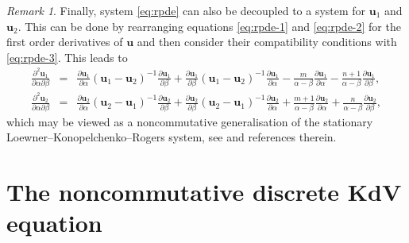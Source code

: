 \documentclass[dvips,10pt]{article}
\newcommand{\bs}{\boldsymbol}
\newcommand{\bsu}{ {\bs{u}}}
\theoremstyle{remark} %
\newtheorem{remark}{Remark}
\begin{document}
\begin{remark}
		Finally, system \eqref{eq:rpde} can also be decoupled to a system for $\bsu_1$ and $\bsu_2$. This can be done by rearranging equations \eqref{eq:rpde-1} and \eqref{eq:rpde-2} for the first order derivatives of $\bsu$ and then consider their compatibility conditions with \eqref{eq:rpde-3}. This leads to 
		\begin{eqnarray*}
			\frac{\partial^2 {\bs{u}}_1}{\partial \alpha \partial \beta} &=& \frac{\partial {\bs{u}}_1}{\partial \alpha}\left({\bs{u}}_{1} -{\bs{u}}_{2}\right) ^{-1}   \frac{\partial {\bs{u}}_1}{\partial \beta} +  \frac{\partial {\bs{u}}_1}{\partial \beta}\left({\bs{u}}_{1} -{\bs{u}}_{2}\right) ^{-1}   \frac{\partial {\bs{u}}_1}{\partial \alpha} - \frac{m}{\alpha-\beta}  \frac{\partial {\bs{u}}_1}{\partial \alpha} - \frac{n+1}{\alpha-\beta}   \frac{\partial {\bs{u}}_1}{\partial \beta}, \\
			\frac{\partial^2 {\bs{u}}_2}{\partial \alpha \partial \beta} &=& \frac{\partial {\bs{u}}_2}{\partial \alpha}\left({\bs{u}}_{2} -{\bs{u}}_{1}\right) ^{-1}   \frac{\partial {\bs{u}}_2}{\partial \beta}  + \frac{\partial {\bs{u}}_2}{\partial \beta}\left({\bs{u}}_{2} -{\bs{u}}_{1}\right) ^{-1}   \frac{\partial {\bs{u}}_2}{\partial \alpha} + \frac{m+1}{\alpha-\beta}  \frac{\partial {\bs{u}}_2}{\partial \alpha} + \frac{n}{\alpha-\beta}   \frac{\partial {\bs{u}}_2}{\partial \beta},
		\end{eqnarray*} 
		which may be viewed as a noncommutative generalisation of the stationary Loewner--Konopelchenko--Rogers system, see \cite{TTX, WS} and references therein.
	\end{remark}
	
	
	\section{The noncommutative discrete KdV equation} \label{sec:KdV}
	
\end{document}
